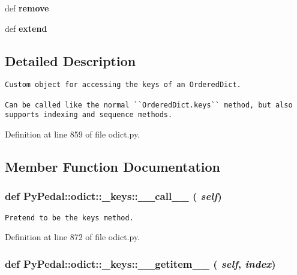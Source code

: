 \begin{CompactItemize}
\item 
\hypertarget{classPyPedal_1_1odict_1_1__keys_d0c83611d99931ce0cb0ad3907367117}{
def \textbf{remove}}
\label{classPyPedal_1_1odict_1_1__keys_d0c83611d99931ce0cb0ad3907367117}

\item 
\hypertarget{classPyPedal_1_1odict_1_1__keys_33f2d696f589116e7cdfd50aa1f9dfcc}{
def \textbf{extend}}
\label{classPyPedal_1_1odict_1_1__keys_33f2d696f589116e7cdfd50aa1f9dfcc}

\end{CompactItemize}


\subsection{Detailed Description}


\footnotesize\begin{verbatim}
Custom object for accessing the keys of an OrderedDict.

Can be called like the normal ``OrderedDict.keys`` method, but also
supports indexing and sequence methods.
\end{verbatim}
\normalsize
 

Definition at line 859 of file odict.py.

\subsection{Member Function Documentation}
\hypertarget{classPyPedal_1_1odict_1_1__keys_8f9e87e413cc7be14a78f925d4161cf7}{
\subsubsection{\setlength{\rightskip}{0pt plus 5cm}def PyPedal::odict::\_\-keys::\_\-\_\-call\_\-\_\- ( {\em self})}}
\label{classPyPedal_1_1odict_1_1__keys_8f9e87e413cc7be14a78f925d4161cf7}




\footnotesize\begin{verbatim}Pretend to be the keys method.\end{verbatim}
\normalsize
 

Definition at line 872 of file odict.py.\hypertarget{classPyPedal_1_1odict_1_1__keys_d24179317d2b9b3637aa389a2cd0db4c}{
\subsubsection{\setlength{\rightskip}{0pt plus 5cm}def PyPedal::odict::\_\-keys::\_\-\_\-getitem\_\-\_\- ( {\em self}, \/   {\em index})}}
\label{classPyPedal_1_1odict_1_1__keys_d24179317d2b9b3637aa389a2cd0db4c}




